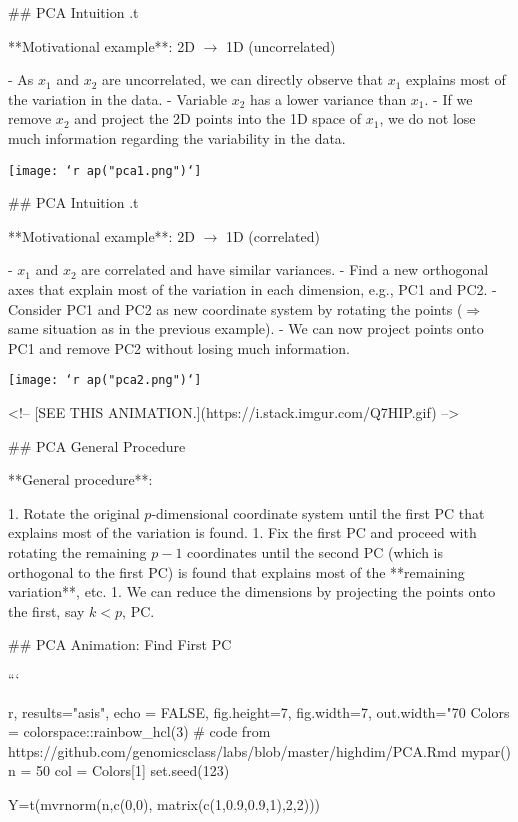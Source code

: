 {## PCA Intuition {.t}

**Motivational example**: 2D $\rightarrow$ 1D (uncorrelated)

- As $x_1$ and $x_2$ are uncorrelated, we can directly observe that $x_1$ explains most of the variation in the data.
- Variable $x_2$ has a lower variance than $x_1$.
- If we remove $x_2$ and project the 2D points into the 1D space of $x_1$, we do not lose much information regarding the variability in the data.

\begin{center}
  \texttt{[image: `r ap("pca1.png")`]}
\end{center}

## PCA Intuition {.t}

**Motivational example**: 2D $\rightarrow$ 1D (correlated)

- $x_1$ and $x_2$ are correlated and have similar variances.
- Find a new orthogonal axes that explain most of the variation in each dimension, e.g., PC1 and PC2.
- Consider PC1 and PC2 as new coordinate system by rotating the points ($\Rightarrow$ same situation as in the previous example).
- We can now project points onto PC1 and remove PC2 without losing much information.

\begin{center}
  \texttt{[image: `r ap("pca2.png")`]}
\end{center}

<!-- [SEE THIS ANIMATION.](https://i.stack.imgur.com/Q7HIP.gif) -->

## PCA General Procedure

**General procedure**:

1. Rotate the original $p$-dimensional coordinate system until the first PC that explains most of the variation is found.
1. Fix the first PC and proceed with rotating the remaining $p-1$ coordinates until the second PC (which is orthogonal to the first PC) is found that explains most of the **remaining variation**, etc.
1. We can reduce the dimensions by projecting the points onto the first, say $k<p$, PC.

## PCA Animation: Find First PC

```{r, results="asis", echo = FALSE, fig.height=7, fig.width=7, out.width="70%
Colors = colorspace::rainbow_hcl(3)
# code from https://github.com/genomicsclass/labs/blob/master/highdim/PCA.Rmd
mypar()
n = 50
col = Colors[1]
set.seed(123)

Y=t(mvrnorm(n,c(0,0), matrix(c(1,0.9,0.9,1),2,2)))

}}
